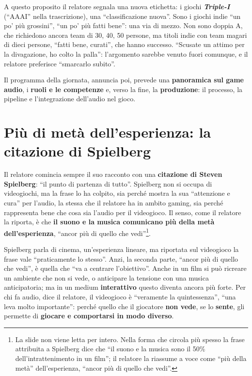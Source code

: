 A questo proposito il relatore segnala una nuova etichetta: i giochi
\textbf{\emph{Triple-I}} (``AAAI'' nella trascrizione), una ``classificazione
nuova''. Sono i giochi indie ``un po' più grossini'', ``un po' più fatti
bene'': una via di mezzo. Non sono doppia A, che richiedono ancora team di 30,
40, 50 persone, ma titoli indie con team magari di dieci persone, ``fatti bene,
curati'', che hanno successo. ``Scusate un attimo per la divagazione, ho colto la
palla'': l'argomento sarebbe venuto fuori comunque, e il relatore preferisce
``smarcarlo subito''.

Il programma della giornata, annuncia poi, prevede una \textbf{panoramica sul
game audio}, i \textbf{ruoli e le competenze} e, verso la fine, la
\textbf{produzione}: il processo, la pipeline e l'integrazione dell'audio nel
gioco.

\section{Più di metà dell'esperienza: la citazione di Spielberg}
\label{z9:sec:spielberg}

Il relatore comincia sempre il suo racconto con una \textbf{citazione di Steven
Spielberg}: ``il punto di partenza di tutto''. Spielberg non si occupa di
videogiochi, ma la frase lo ha colpito, sia perché mostra la sua ``attenzione e
cura'' per l'audio, la stessa che il relatore ha in ambito gaming, sia perché
rappresenta bene che cosa sia l'audio per il videogioco. Il senso, come il
relatore la riporta, è che \textbf{il suono e la musica comunicano più della metà
dell'esperienza}, ``ancor più di quello che vedi''\footnote{La slide non viene
letta per intero. Nella forma che circola più spesso la frase attribuita a
Spielberg dice che ``il suono e la musica sono il 50\% dell'intrattenimento in un
film''; il relatore la riassume a voce come ``più della metà'' dell'esperienza,
``ancor più di quello che vedi''.}.

Spielberg parla di cinema, un'esperienza lineare, ma riportata sul videogioco la
frase vale ``praticamente lo stesso''. Anzi, la seconda parte, ``ancor più di
quello che vedi'', è quella che ``va a centrare l'obiettivo''. Anche in un film si
può ricreare un ambiente che non si vede, o anticipare la tensione con una musica
anticipatoria; ma in un medium \textbf{interattivo} questo diventa ancora più
forte. Per chi fa audio, dice il relatore, il videogioco è ``veramente la
quintessenza'', ``una leva molto importante'': perché quello che il giocatore
\textbf{non vede}, se lo \textbf{sente}, gli permette di \textbf{giocare e
comportarsi in modo diverso}.

